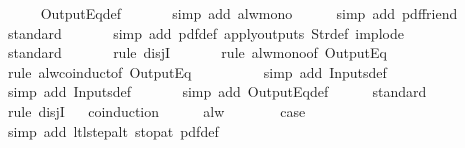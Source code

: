 \begin{isabellebody}
\ \ \ \ \isamarkupfalse%
\ OutputEq{\isacharunderscore}def\isanewline
\ \ \ \ \ \isamarkupfalse%
\ {\isacharparenleft}simp\ add{\isacharcolon}\ alw{\isacharunderscore}mono{\isacharparenright}\isanewline
\ \ \ \ \isamarkupfalse%
\ {\isacharparenleft}simp\ add{\isacharcolon}\ pdf{\isacharunderscore}friend{\isacharparenright}\isanewline
\ \ \ \ \isamarkupfalse%
\ standard\isanewline
\ \ \ \ \ \isamarkupfalse%
\ {\isacharparenleft}simp\ add{\isacharcolon}\ pdf{\isacharunderscore}def\ apply{\isacharunderscore}outputs\ Str{\isacharunderscore}def\ implode{\isacharparenright}\isanewline
\ \ \ \ \ \isamarkupfalse%
\ standard\isanewline
\ \ \ \ \ \isamarkupfalse%
\ {\isacharparenleft}rule\ disjI{}{\isacharparenright}\isanewline
\ \ \ \ \ \isamarkupfalse%
\ {\isacharparenleft}rule\ alw{\isacharunderscore}mono{\isacharbrackleft}of\ {\isachardoublequoteopen}OutputEq\ {\isacharbrackleft}{\isacharbrackright}{\isachardoublequoteclose}{\isacharbrackright}{\isacharparenright}\isanewline
\ \ \ \ \ \ \isamarkupfalse%
\ {\isacharparenleft}rule\ alw{\isachardot}coinduct{\isacharbrackleft}of\ {\isachardoublequoteopen}OutputEq\ {\isacharbrackleft}{\isacharbrackright}{\isachardoublequoteclose}{\isacharbrackright}{\isacharparenright}\isanewline
\ \ \ \ \ \ \ \isamarkupfalse%
\ {\isacharparenleft}simp\ add{\isacharcolon}\ Inputs{\isacharunderscore}def{\isacharparenright}\isanewline
\ \ \ \ \ \ \isamarkupfalse%
\ {\isacharparenleft}simp\ add{\isacharcolon}\ Inputs{\isacharunderscore}def{\isacharparenright}\isanewline
\ \ \ \ \ \isamarkupfalse%
\ {\isacharparenleft}simp\ add{\isacharcolon}\ OutputEq{\isacharunderscore}def{\isacharparenright}\isanewline
\ \ \ \ \isamarkupfalse%
\ standard\isanewline
\ \ \ \ \isamarkupfalse%
\ {\isacharparenleft}rule\ disjI{}{\isacharparenright}\isanewline
\ \ \isamarkupfalse%
{\isacharparenleft}coinduction{\isacharparenright}\isanewline
\ \ \ \ \isamarkupfalse%
\ alw\isanewline
\ \ \ \ \isamarkupfalse%
\ \isamarkupfalse%
\ {\isacharquery}case\isanewline
\ \ \ \ \ \ \isamarkupfalse%
\ {\isacharparenleft}simp\ add{\isacharcolon}\ ltl{\isacharunderscore}step{\isacharunderscore}alt\ stop{\isacharunderscore}at{\isacharunderscore}{}\ pdf{\isacharunderscore}def{\isacharparenright}\isanewline

\end{isabellebody}
